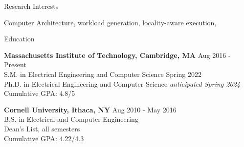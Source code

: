 \documentclass{resume} %
\begin{document}

\begin{rSection}{Research Interests}

Computer Architecture, workload generation, locality-aware execution,

\end{rSection}


\begin{rSection}{Education}

{\bf Massachusetts Institute of Technology, Cambridge, MA} \hfill { Aug 2016 - Present} \\ 
S.M. in Electrical Engineering and Computer Science \hfill {Spring 2022} \\
Ph.D. in Electrical Engineering and Computer Science \hfill { \it{anticipated} Spring 2024} \\
Cumulative GPA: 4.8/5

{\bf Cornell University, Ithaca, NY} \hfill { Aug 2010 - May 2016} \\ 
B.S. in Electrical and Computer Engineering \\
Dean's List, all semesters \\
Cumulative GPA: 4.22/4.3 

\end{rSection}

\end{document}

